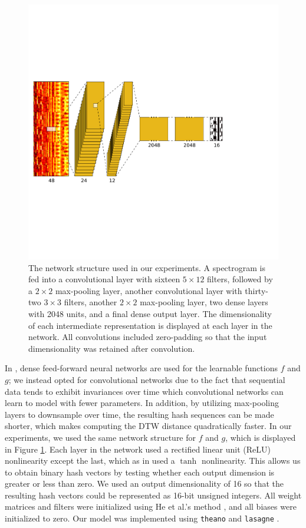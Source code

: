 \documentclass{article} %
\begin{document}
\begin{figure}
  \centering
  \includegraphics[width=.8\textwidth]{network.pdf}
  \caption{The network structure used in our experiments.
  A spectrogram is fed into a convolutional layer with sixteen $5 \times 12$ filters, followed by a $2\times2$ max-pooling layer, another convolutional layer with thirty-two $3\times3$ filters, another $2\times2$ max-pooling layer, two dense layers with 2048 units, and a final dense output layer.
  The dimensionality of each intermediate representation is displayed at each layer in the network.
  All convolutions included zero-padding so that the input dimensionality was retained after convolution.}
  \label{fig:network}
\end{figure}

In \cite{masci2014multimodal}, dense feed-forward neural networks are used for the learnable functions $f$ and $g$; we instead opted for convolutional networks due to the fact that sequential data tends to exhibit invariances over time which convolutional networks can learn to model with fewer parameters.
In addition, by utilizing max-pooling layers to downsample over time, the resulting hash sequences can be made shorter, which makes computing the DTW distance quadratically faster.
In our experiments, we used the same network structure for $f$ and $g$, which is displayed in Figure \ref{fig:network}.
Each layer in the network used a rectified linear unit (ReLU) nonlinearity except the last, which as in \cite{masci2014multimodal} used a $\tanh$ nonlinearity.
This allows us to obtain binary hash vectors by testing whether each output dimension is greater or less than zero.
We used an output dimensionality of 16 so that the resulting hash vectors could be represented as 16-bit unsigned integers.
All weight matrices and filters were initialized using He et al.'s method \cite{he2015delving}, and all biases were initialized to zero.
Our model was implemented using \texttt{theano} \cite{bastien2012theano,bergstra2010theano} and \texttt{lasagne} \cite{dieleman2015lasagne}.
\end{document}
